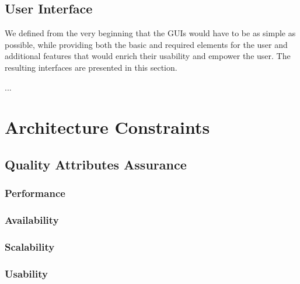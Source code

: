 \documentclass[12pt]{article}
\begin{document}
\newpage
\subsection{User Interface} \label{ui} %

We defined from the very beginning that the GUIs would have to be as simple as possible, while providing both the basic and required elements for the user and 
additional features that would enrich their usability and empower the user.
The resulting interfaces are presented in this section.

...

\newpage
\section{Architecture Constraints} \label{constraints} %


\subsection{Quality Attributes Assurance} \label{qaa} %

\subsubsection{Performance}

\subsubsection{Availability}

\subsubsection{Scalability}

\subsubsection{Usability}
\end{document}
